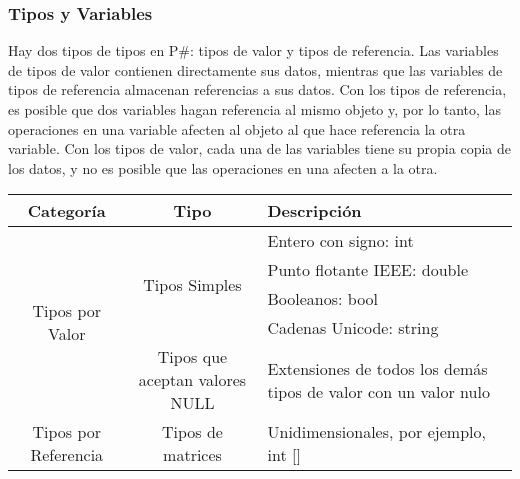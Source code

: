 	\subsubsection{Tipos y Variables}
		Hay dos tipos de tipos en P\#: tipos de valor y tipos de referencia. Las variables de tipos de valor contienen directamente sus datos, mientras que las variables de tipos de referencia almacenan referencias a sus datos. Con los tipos de referencia, es posible que dos variables hagan referencia al mismo objeto y, por lo tanto, las operaciones en una variable afecten al objeto al que hace referencia la otra variable. Con los tipos de valor, cada una de las variables tiene su propia copia de los datos, y no es posible que las operaciones en una afecten a la otra.\par
		\begin{center}
			\begin{tabular}{| c | c | m{5cm} | }
				\hline
				Categoría & Tipo & Descripción \\ \hline
				\multirow{5}{*}{Tipos por Valor} & \multirow{4}{*}{Tipos Simples} & Entero con signo: int \\ \cline{3-3}
				 &  & Punto flotante IEEE: double \\ \cline{3-3}
				 &  & Booleanos: bool \\ \cline{3-3}
				 &  & Cadenas Unicode: string \\ \cline{2-3}
				 & Tipos que aceptan valores NULL & Extensiones de todos los demás tipos de valor con un valor nulo \\ \hline
				 Tipos por Referencia & Tipos de matrices & Unidimensionales, por ejemplo, int [] \\ \hline
			\end{tabular}
		\end{center}
